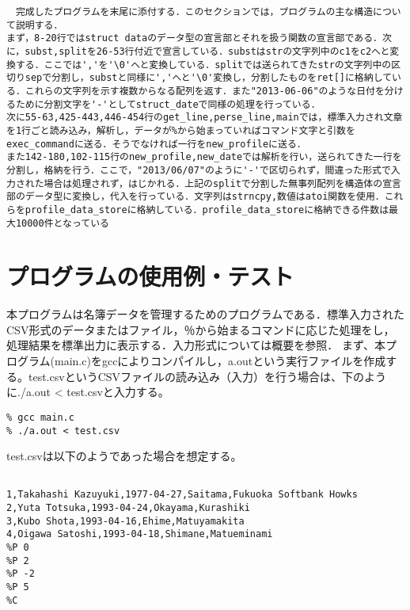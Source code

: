 \documentclass[a4j]{jarticle}
\begin{document}
\begin{verbatim}
　完成したプログラムを末尾に添付する．このセクションでは，プログラムの主な構造について説明する．
まず，8-20行ではstruct dataのデータ型の宣言部とそれを扱う関数の宣言部である．次に，subst,splitを26-53行付近で宣言している．substはstrの文字列中のc1をc2へと変換する．ここでは','を'\0'へと変換している．splitでは送られてきたstrの文字列中の区切りsepで分割し，substと同様に','へと'\0'変換し，分割したものをret[]に格納している．これらの文字列を示す複数からなる配列を返す．また"2013-06-06"のような日付を分けるために分割文字を'-'としてstruct_dateで同様の処理を行っている．
次に55-63,425-443,446-454行のget_line,perse_line,mainでは，標準入力され文章を1行ごと読み込み，解析し，データが%から始まっていればコマンド文字と引数をexec_commandに送る．そうでなければ一行をnew_profileに送る．
また142-180,102-115行のnew_profile,new_dateでは解析を行い，送られてきた一行を分割し，格納を行う．ここで，"2013/06/07"のように'-'で区切られず，間違った形式で入力された場合は処理されず，はじかれる．上記のsplitで分割した無事列配列を構造体の宣言部のデータ型に変換し，代入を行っている．文字列はstrncpy,数値はatoi関数を使用．これらをprofile_data_storeに格納している．profile_data_storeに格納できる件数は最大10000件となっている

\end{verbatim}

%
%

\section{プログラムの使用例・テスト}

本プログラムは名簿データを管理するためのプログラムである．標準入力されたCSV形式のデータまたはファイル，％から始まるコマンドに応じた処理をし，処理結果を標準出力に表示する．入力形式については概要を参照．
まず、本プログラム(main.c)をgccによりコンパイルし，a.outという実行ファイルを作成する。test.csvというCSVファイルの読み込み（入力）を行う場合は、下のように./a.out < test.csvと入力する。

{\baselineskip 3mm
\begin{verbatim}
% gcc main.c
% ./a.out < test.csv
\end{verbatim}
}

test.csvは以下のようであった場合を想定する。

{\baselineskip 3mm
\begin{verbatim}

1,Takahashi Kazuyuki,1977-04-27,Saitama,Fukuoka Softbank Howks
2,Yuta Totsuka,1993-04-24,Okayama,Kurashiki
3,Kubo Shota,1993-04-16,Ehime,Matuyamakita
4,Oigawa Satoshi,1993-04-18,Shimane,Matueminami
%P 0
%P 2
%P -2
%P 5
%C
\end{verbatim}
}
\end{document}
